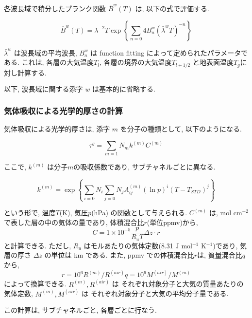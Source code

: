 各波長域で積分したプランク関数 $\overline{B}^w(T)$ は,
以下の式で評価する.

\begin{equation}
  \overline{B}^w(T) 
   = \lambda^{-2} T \exp \left\{ \sum_{n=0}{4} B^w_n (\bar{\lambda}^w T)^{-n}
                         \right\}
\end{equation}

$\bar{\lambda}^w$ は波長域の平均波長,
$B^w_n$ は function fitting によって定められたパラメータである.
これは, 各層の大気温度$T_l$, 各層の境界の大気温度$T_{l+1/2}$
と地表面温度$T_g$に対し計算する.

以下, 波長域に関する添字 $w$ は基本的に省略する.

\subsubsection{気体吸収による光学的厚さの計算 }

気体吸収による光学的厚さは, 添字 $m$ を分子の種類として,
以下のようになる. 

\begin{equation}
  \tau^g = \sum_{m=1}{N_m} k^{(m)} C^{(m)}
\end{equation}

ここで, $k^{(m)}$ は分子$m$の吸収係数であり, サブチャネルごとに異なる.

\begin{equation}
 k^{(m)} = \exp\left\{ \sum_{i=0}{N_i} \sum_{j=0}{N_j} A^{(m)}_{ij}
                   (\ln p)^{i} (T-T_{STD})^{j}
               \right\}
\end{equation}

という形で, 温度$T$(K), 気圧$p$(hPa) の関数として与えられる.
$C^{(m)}$ は, mol cm$^{-2}$ で表した層の中の気体の量であり,
体積混合比$r$(単位ppmv)から,
\begin{equation}
  C = 1\times 10^{-5} \frac{p}{R_u T} \Delta z \cdot r
\end{equation}
と計算できる. 
ただし, $R_u$ はモルあたりの気体定数(8.31 J mol$^{-1}$ K$^{-1}$)であり,
気層の厚さ $\Delta z$ の単位は km である.
また, ppmv での体積混合比$r$は, 
質量混合比$q$から, 
\begin{equation}
  r = 10^6 R^{(m)}/R^{(air)} q = 10^6 M^{(air)}/M^{(m)}
\end{equation}
によって換算できる.
$R^{(m)},R^{(air)}$ は
それぞれ対象分子と大気の質量あたりの気体定数,
$M^{(m)},M^{(air)}$ は
それぞれ対象分子と大気の平均分子量である.

この計算は, サブチャネルごと, 各層ごとに行なう.

